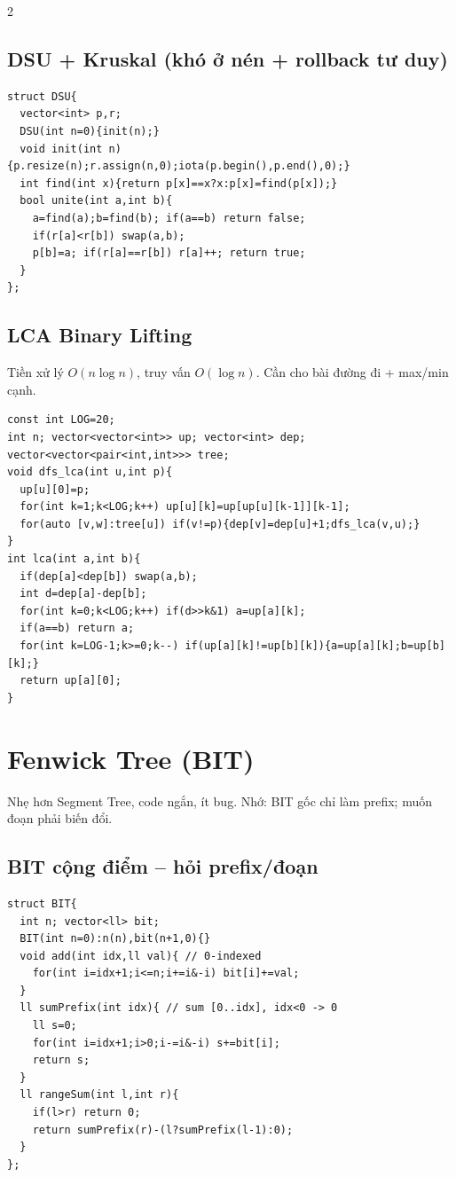 \documentclass[8pt]{extarticle}
\begin{document}
\begin{multicols}{2}
\subsection{DSU + Kruskal (khó ở nén + rollback tư duy)}
\begin{lstlisting}
struct DSU{
  vector<int> p,r;
  DSU(int n=0){init(n);}
  void init(int n){p.resize(n);r.assign(n,0);iota(p.begin(),p.end(),0);}
  int find(int x){return p[x]==x?x:p[x]=find(p[x]);}
  bool unite(int a,int b){
    a=find(a);b=find(b); if(a==b) return false;
    if(r[a]<r[b]) swap(a,b);
    p[b]=a; if(r[a]==r[b]) r[a]++; return true;
  }
};
\end{lstlisting}

\subsection{LCA Binary Lifting}
Tiền xử lý $O(n\log n)$, truy vấn $O(\log n)$. Cần cho bài đường đi + max/min cạnh.
\begin{lstlisting}
const int LOG=20;
int n; vector<vector<int>> up; vector<int> dep;
vector<vector<pair<int,int>>> tree;
void dfs_lca(int u,int p){
  up[u][0]=p;
  for(int k=1;k<LOG;k++) up[u][k]=up[up[u][k-1]][k-1];
  for(auto [v,w]:tree[u]) if(v!=p){dep[v]=dep[u]+1;dfs_lca(v,u);}
}
int lca(int a,int b){
  if(dep[a]<dep[b]) swap(a,b);
  int d=dep[a]-dep[b];
  for(int k=0;k<LOG;k++) if(d>>k&1) a=up[a][k];
  if(a==b) return a;
  for(int k=LOG-1;k>=0;k--) if(up[a][k]!=up[b][k]){a=up[a][k];b=up[b][k];}
  return up[a][0];
}
\end{lstlisting}

\section{Fenwick Tree (BIT)}
Nhẹ hơn Segment Tree, code ngắn, ít bug. Nhớ: BIT gốc chỉ làm prefix; muốn đoạn phải biến đổi.

\subsection{BIT cộng điểm -- hỏi prefix/đoạn}
\begin{lstlisting}
struct BIT{
  int n; vector<ll> bit;
  BIT(int n=0):n(n),bit(n+1,0){}
  void add(int idx,ll val){ // 0-indexed
    for(int i=idx+1;i<=n;i+=i&-i) bit[i]+=val;
  }
  ll sumPrefix(int idx){ // sum [0..idx], idx<0 -> 0
    ll s=0;
    for(int i=idx+1;i>0;i-=i&-i) s+=bit[i];
    return s;
  }
  ll rangeSum(int l,int r){
    if(l>r) return 0;
    return sumPrefix(r)-(l?sumPrefix(l-1):0);
  }
};
\end{lstlisting}


\end{multicols}
\end{document}
